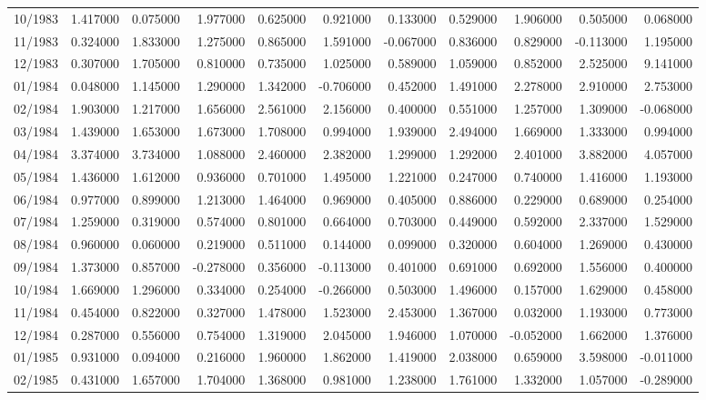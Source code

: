 \begin{tabular}{lrrrrrrrrrr}
10/1983 & 1.417000 & 0.075000 & 1.977000 & 0.625000 & 0.921000 & 0.133000 & 0.529000 & 1.906000 & 0.505000 & 0.068000 \\
11/1983 & 0.324000 & 1.833000 & 1.275000 & 0.865000 & 1.591000 & -0.067000 & 0.836000 & 0.829000 & -0.113000 & 1.195000 \\
12/1983 & 0.307000 & 1.705000 & 0.810000 & 0.735000 & 1.025000 & 0.589000 & 1.059000 & 0.852000 & 2.525000 & 9.141000 \\
01/1984 & 0.048000 & 1.145000 & 1.290000 & 1.342000 & -0.706000 & 0.452000 & 1.491000 & 2.278000 & 2.910000 & 2.753000 \\
02/1984 & 1.903000 & 1.217000 & 1.656000 & 2.561000 & 2.156000 & 0.400000 & 0.551000 & 1.257000 & 1.309000 & -0.068000 \\
03/1984 & 1.439000 & 1.653000 & 1.673000 & 1.708000 & 0.994000 & 1.939000 & 2.494000 & 1.669000 & 1.333000 & 0.994000 \\
04/1984 & 3.374000 & 3.734000 & 1.088000 & 2.460000 & 2.382000 & 1.299000 & 1.292000 & 2.401000 & 3.882000 & 4.057000 \\
05/1984 & 1.436000 & 1.612000 & 0.936000 & 0.701000 & 1.495000 & 1.221000 & 0.247000 & 0.740000 & 1.416000 & 1.193000 \\
06/1984 & 0.977000 & 0.899000 & 1.213000 & 1.464000 & 0.969000 & 0.405000 & 0.886000 & 0.229000 & 0.689000 & 0.254000 \\
07/1984 & 1.259000 & 0.319000 & 0.574000 & 0.801000 & 0.664000 & 0.703000 & 0.449000 & 0.592000 & 2.337000 & 1.529000 \\
08/1984 & 0.960000 & 0.060000 & 0.219000 & 0.511000 & 0.144000 & 0.099000 & 0.320000 & 0.604000 & 1.269000 & 0.430000 \\
09/1984 & 1.373000 & 0.857000 & -0.278000 & 0.356000 & -0.113000 & 0.401000 & 0.691000 & 0.692000 & 1.556000 & 0.400000 \\
10/1984 & 1.669000 & 1.296000 & 0.334000 & 0.254000 & -0.266000 & 0.503000 & 1.496000 & 0.157000 & 1.629000 & 0.458000 \\
11/1984 & 0.454000 & 0.822000 & 0.327000 & 1.478000 & 1.523000 & 2.453000 & 1.367000 & 0.032000 & 1.193000 & 0.773000 \\
12/1984 & 0.287000 & 0.556000 & 0.754000 & 1.319000 & 2.045000 & 1.946000 & 1.070000 & -0.052000 & 1.662000 & 1.376000 \\
01/1985 & 0.931000 & 0.094000 & 0.216000 & 1.960000 & 1.862000 & 1.419000 & 2.038000 & 0.659000 & 3.598000 & -0.011000 \\
02/1985 & 0.431000 & 1.657000 & 1.704000 & 1.368000 & 0.981000 & 1.238000 & 1.761000 & 1.332000 & 1.057000 & -0.289000 \\

\end{tabular}
